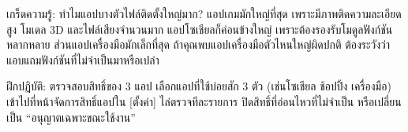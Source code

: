 \begin{tcbinfo}{เกร็ดความรู้: ทำไมแอปบางตัวไฟล์ติดตั้งใหญ่มาก?}
แอปเกมมักใหญ่ที่สุด เพราะมีภาพติดความละเอียดสูง โมเดล 3D และไฟล์เสียงจำนวนมาก แอปโซเชียลก็ค่อนข้างใหญ่ เพราะต้องรองรับโมดูลฟังก์ชันหลากหลาย ส่วนแอปเครื่องมือมักเล็กที่สุด ถ้าคุณพบแอปเครื่องมือตัวไหนใหญ่ผิดปกติ ต้องระวังว่าแอบแถมฟังก์ชันที่ไม่จำเป็นมาหรือเปล่า

\end{tcbinfo}

\begin{tcbpractice}{ฝึกปฏิบัติ: ตรวจสอบสิทธิ์ของ 3 แอป}
เลือกแอปที่ใช้บ่อยสัก 3 ตัว (เช่นโซเชียล ช้อปปิ้ง เครื่องมือ) เข้าไปที่หน้าจัดการสิทธิ์แอปใน [ตั้งค่า] ไล่ตรวจทีละรายการ ปิดสิทธิ์ที่อ่อนไหวที่ไม่จำเป็น หรือเปลี่ยนเป็น “อนุญาตเฉพาะขณะใช้งาน”

\end{tcbpractice}
